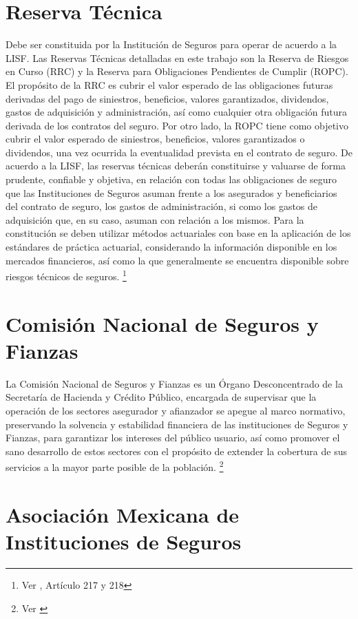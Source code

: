 \documentclass[11pt,twoside,openright,spanish]{report}
\numberwithin{equation}{chapter}
\numberwithin{figure}{chapter}
\numberwithin{table}{chapter}
\begin{document}
	\section{Reserva Técnica}
	\doublespacing
	Debe ser constituida por la Institución de Seguros para operar de acuerdo a la LISF. Las Reservas Técnicas detalladas en este trabajo son la Reserva de Riesgos en Curso (RRC) y la Reserva para Obligaciones Pendientes de Cumplir (ROPC). El propósito de la RRC es cubrir el valor esperado de las obligaciones futuras derivadas del pago de siniestros, beneficios, valores garantizados, dividendos, gastos de adquisición y administración, así como cualquier otra obligación futura derivada de los contratos del seguro. Por otro lado, la ROPC tiene como objetivo cubrir el valor esperado de siniestros, beneficios, valores garantizados o dividendos, una vez ocurrida la eventualidad prevista en el contrato de seguro. De acuerdo a la LISF, las reservas técnicas deberán constituirse y valuarse de forma prudente, confiable y objetiva, en relación con todas las obligaciones de seguro que las Instituciones de Seguros asuman frente a los asegurados y beneficiarios del contrato de seguro, los gastos de administración, si como los gastos de adquisición que, en su caso, asuman con relación a los mismos. Para la constitución se deben utilizar métodos actuariales con base en la aplicación de los estándares de práctica actuarial, considerando la información disponible en los mercados financieros, así como la que generalmente se encuentra disponible sobre riesgos técnicos de seguros. \footnote{Ver \citet{DReservasTec}, Artículo 217 y 218}
	
	\section{Comisión Nacional de Seguros y Fianzas}
	\doublespacing
	La Comisión Nacional de Seguros y Fianzas es un Órgano Desconcentrado de la Secretaría de Hacienda y Crédito Público, encargada de supervisar que la operación de los sectores asegurador y afianzador se apegue al marco normativo, preservando la solvencia y estabilidad financiera de las instituciones de Seguros y Fianzas, para garantizar los intereses del público usuario, así como promover el sano desarrollo de estos sectores con el propósito de extender la cobertura de sus servicios a la mayor parte posible de la población. \footnote{Ver \citet{EComision}}
	
	\section{Asociación Mexicana de Instituciones de Seguros}
	\doublespacing
	
\end{document}
